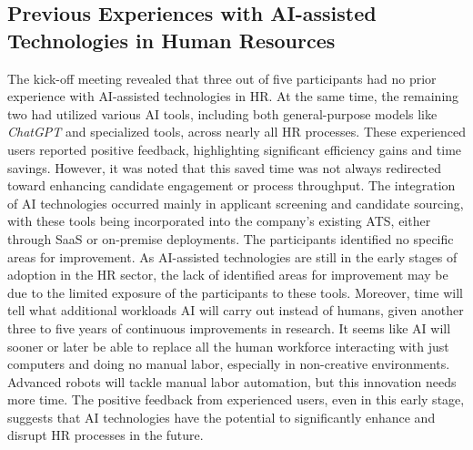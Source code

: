\documentclass[draft,final]{thesisclass} %
\begin{document}
\subsection{Previous Experiences with \acs{AI}-assisted Technologies in Human Resources}
The kick-off meeting revealed that three out of five participants had no prior experience with \acs{AI}-assisted technologies in \acs{HR}. At the same time, the remaining two had utilized various \acs{AI} tools, including both general-purpose models like \textit{ChatGPT} and specialized tools, across nearly all \acs{HR} processes. These experienced users reported positive feedback, highlighting significant efficiency gains and time savings. However, it was noted that this saved time was not always redirected toward enhancing candidate engagement or process throughput. The integration of \acs{AI} technologies occurred mainly in applicant screening and candidate sourcing, with these tools being incorporated into the company's existing \acs{ATS}, either through \acs{SaaS} or on-premise deployments. The participants identified no specific areas for improvement. As \acs{AI}-assisted technologies are still in the early stages of adoption in the \acs{HR} sector, the lack of identified areas for improvement may be due to the limited exposure of the participants to these tools. 
Moreover, time will tell what additional workloads \acs{AI} will carry out instead of humans, given another three to five years of continuous improvements in research. It seems like \acs{AI} will sooner or later be able to replace all the human workforce interacting with just computers and doing no manual labor, especially in non-creative environments. Advanced robots will tackle manual labor automation, but this innovation needs more time. The positive feedback from experienced users, even in this early stage, suggests that \acs{AI} technologies have the potential to significantly enhance and disrupt \acs{HR} processes in the future.
\end{document}

